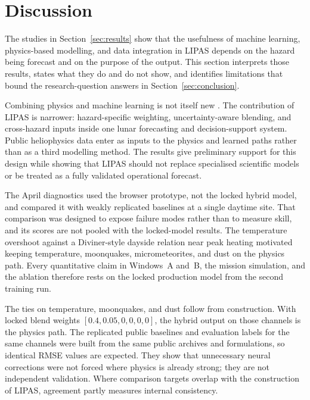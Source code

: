 \section{Discussion}
\label{sec:discussion}

The studies in Section~\ref{sec:results} show that the usefulness of machine learning, physics-based modelling, and data integration in LIPAS depends on the hazard being forecast and on the purpose of the output. This section interprets those results, states what they do and do not show, and identifies limitations that bound the research-question answers in Section~\ref{sec:conclusion}.

Combining physics and machine learning is not itself new \citep{karpatne2017,willard2022,camporeale2019}. The contribution of LIPAS is narrower: hazard-specific weighting, uncertainty-aware blending, and cross-hazard inputs inside one lunar forecasting and decision-support system. Public heliophysics data enter as inputs to the physics and learned paths rather than as a third modelling method. The results give preliminary support for this design while showing that LIPAS should not replace specialised scientific models or be treated as a fully validated operational forecast.

The April diagnostics used the browser prototype, not the locked hybrid model, and compared it with weakly replicated baselines at a single daytime site. That comparison was designed to expose failure modes rather than to measure skill, and its scores are not pooled with the locked-model results. The temperature overshoot against a Diviner-style dayside relation near peak heating motivated keeping temperature, moonquakes, micrometeorites, and dust on the physics path. Every quantitative claim in Windows~A and~B, the mission simulation, and the ablation therefore rests on the locked production model from the second training run.

The ties on temperature, moonquakes, and dust follow from construction. With locked blend weights $[0.4,0.05,0,0,0,0]$, the hybrid output on those channels is the physics path. The replicated public baselines and evaluation labels for the same channels were built from the same public archives and formulations, so identical RMSE values are expected. They show that unnecessary neural corrections were not forced where physics is already strong; they are not independent validation. Where comparison targets overlap with the construction of LIPAS, agreement partly measures internal consistency.

